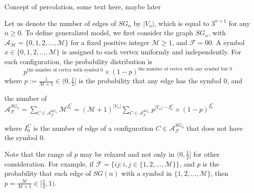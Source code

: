 Concept of percolation, {\color{red}some text here}, {\color{blue} maybe later}

Let us denote the number of edges of $SG_n$ by $|V_n|$, which is equal to $3^{n+1}$ for any $n \geq 0$. To define generalized model, we first consider the graph $SG_n$, with $\mathscr{A}_{\mathscr{M}} = \{0,1,2, \ldots,\mathscr{M}\}$ for a fixed positive integer $\mathscr{M} \geq 1$, and $\mathscr{F} = 00$. A symbol $x \in \{0,1,2,\ldots,\mathscr{M}\}$ is assigned to each vertex uniformly and independently. For each configuration, the probability distribution is 
$$p^{\text{the number of vertex with symbol 0}} \times (1-p)^{\text{the number of vertex with any symbol but 0}}$$ 
where $p:=\frac{1}{\mathscr{M}+1}\in (0,\frac{1}{2}]$ is the probability that any edge has the symbol $0$, and
\begin{center}
the number of $\mathscr{A}^{SG_n}_{\mathscr{F}} 
= \sum\limits_{C \in \mathscr{A}^{SG_n}_{\mathscr{F}}}\mathscr{M}^{I_0^C} 
= (\mathscr{M} + 1)^{|V_n|}\sum\limits_{C \in \mathscr{A}^{SG_n}_{\mathscr{F}}}
p^{|V_n|-I_0^C} \times (1 - p)^{I_0^C}$
\end{center}
where $I_0^C$ is the number of edge of a configuration $C \in \mathscr{A}^{SG_n}_{\mathscr{F}}$ that does not have the symbol $0$.

Note that the range of $p$ may be relaxed and not only in $(0,\frac{1}{2}]$ for other consideration. For example, if $\mathscr{F} = \{ij:i,j \in \{1,2,\ldots,\mathscr{M}\}\}$, and $p$ is the probability that each edge of $SG(n)$ with a symbol in $\{1,2,\ldots,\mathscr{M}\}$, then $p = \frac{\mathscr{M}}{\mathscr{M}+1} \in [\frac{1}{2},1)$.

